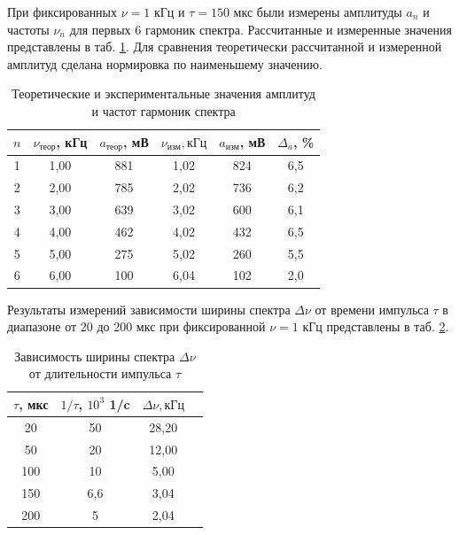 \documentclass[a4paper,12pt]{article} %
\begin{document}
При фиксированных $\nu = 1$ кГц и $\tau = 150$ мкс были измерены амплитуды $a_n$ и частоты $\nu_n$ для первых 6 гармоник спектра. Рассчитанные и измеренные значения представлены в таб. \ref{tab:harmonicsI}. Для сравнения теоретически рассчитанной и измеренной амплитуд сделана нормировка по наименьшему значению.

\begin{table}[h!]
\begin{center}
\begin{tabular}{|c|c|c|c|c|c|}
\hline
$n$ & $\nu_{\text{теор}}$, кГц & $a_{\text{теор}}$, мВ & $\nu_{\text{изм}}, кГц$ & $a_{\text{изм}}$, мВ & $\Delta_a$, \% \\ \hline
1 & 1,00 & 881 & 1,02 & 824 & 6,5 \\ \hline
2 & 2,00 & 785 & 2,02 & 736 & 6,2\\ \hline
3 & 3,00 & 639 & 3,02 & 600 & 6,1 \\ \hline
4 & 4,00 & 462 & 4,02 & 432 & 6,5 \\ \hline
5 & 5,00 & 275 & 5,02 & 260 & 5,5 \\ \hline
6 & 6,00 & 100 & 6,04 & 102 & 2,0 \\ \hline
\end{tabular}
\end{center}
\caption{Теоретические и экспериментальные значения амплитуд и частот гармоник спектра}
\label{tab:harmonicsI}
\end{table}

Результаты измерений зависимости ширины спектра $\Delta{\nu}$ от времени импульса $\tau$ в диапазоне от 20 до 200 мкс при фиксированной $\nu = 1$ кГц представлены в таб. \ref{tab:resultsI}.

\begin{table}[h!]
\begin{center}
\begin{tabular}{|c|c|c|c|}
\hline
$\tau$, мкс & $1/\tau$, $10^3$ 1/c & $\Delta{\nu}, кГц$ \\ \hline
20 & 50 & 28,20 \\ \hline
50 & 20 & 12,00 \\ \hline
100 & 10 & 5,00 \\ \hline
150 & 6,6 & 3,04  \\ \hline
200 & 5 & 2,04 \\ \hline
\end{tabular}
\end{center}
\caption{Зависимость ширины спектра $\Delta{\nu}$ от длительности импульса $\tau$}
\label{tab:resultsI}
\end{table}
\end{document}
